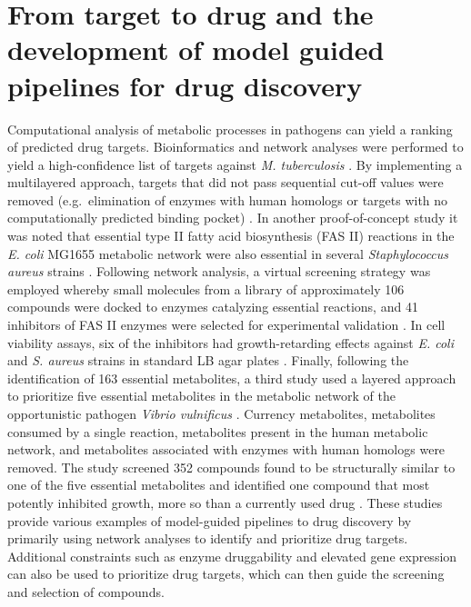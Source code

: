 \section[Model-guided drug discovery pipelines]{From target to drug and the development of 
         model guided pipelines for drug discovery}
Computational analysis of metabolic processes in pathogens can 
yield a ranking of predicted drug targets. Bioinformatics and 
network analyses were performed to yield a high-confidence list 
of targets against \textit{M. tuberculosis} \cite{Raman:2008km}. By implementing a 
multilayered approach, targets that did not pass sequential 
cut-off values were removed (e.g.\ elimination of enzymes with 
human homologs or targets with no computationally predicted 
binding pocket) \cite{Raman:2008km}. In another proof-of-concept study it 
was noted that essential type II fatty acid biosynthesis (FAS II) 
reactions in the \textit{E. coli} MG1655 metabolic network were also 
essential in several \textit{Staphylococcus aureus} strains \cite{Shen:2010cy}. Following 
network analysis, a virtual screening strategy was employed 
whereby small molecules from a library of approximately 106 
compounds were docked to enzymes catalyzing essential reactions, 
and 41 inhibitors of FAS II enzymes were selected for experimental 
validation \cite{Shen:2010cy}. In cell viability assays, six of the inhibitors 
had growth-retarding effects against \textit{E. coli} and \textit{S. aureus} 
strains in standard LB agar plates \cite{Shen:2010cy}. Finally, following 
the identification of 163 essential metabolites, a third study 
used a layered approach to prioritize five essential metabolites 
in the metabolic network of the opportunistic pathogen 
\textit{Vibrio vulnificus} \cite{Kim:2011jm}. Currency metabolites, metabolites consumed by 
a single reaction, metabolites present in the human metabolic 
network, and metabolites associated with enzymes with human 
homologs were removed. The study screened 352 compounds found 
to be structurally similar to one of the five essential metabolites 
and identified one compound that most potently inhibited growth, 
more so than a currently used drug \cite{Kim:2011jm}. These studies provide 
various examples of model-guided pipelines to drug discovery by 
primarily using network analyses to identify and prioritize drug 
targets. Additional constraints such as enzyme druggability and 
elevated gene expression can also be used to prioritize drug 
targets, which can then guide the screening and selection of compounds.

